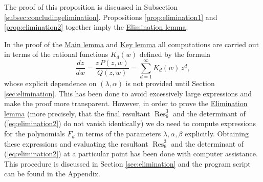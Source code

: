 The proof of this proposition is discussed in Subsection \ref{subsec:concludingelimination}. Propositions \ref{prop:elimination1} and \ref{prop:elimination2} together imply the \hyperref[lemma:elimination]{Elimination lemma}.

\begin{remark}
In the proof of the \hyperref[lemma:main]{Main lemma} and \hyperref[lemma:key]{Key lemma} all computations are carried out in terms of the rational functions $K_d(w)$ defined by the formula
\[ \frac{dz}{dw}=\frac{z\,P(z,w)}{Q(z,w)}=\sum_{d=1}^{\infty}K_d(w)\,z^d, \]
whose explicit dependence on $(\lambda,\alpha)$ is not provided until Section \ref{sec:elimination}. This has been done to avoid excessively large expressions and make the proof more transparent. However, in order to prove the \hyperref[lemma:elimination]{Elimination lemma} (more precisely, that the final resultant $\operatorname{Res}^3_6$ and the determinant of (\ref{eq:elimination2}) do not vanish identically) we do need to compute expressions for the polynomials $F_d$ in terms of the parameters $\lambda,\alpha,\beta$ explicitly. Obtaining these expressions and evaluating the resultant $\operatorname{Res}^3_6$ and the determinant of (\ref{eq:elimination2}) at a particular point has been done with computer assistance. This procedure is discussed in Section \ref{sec:elimination} and the program script can be found in the Appendix. %
\end{remark}






















